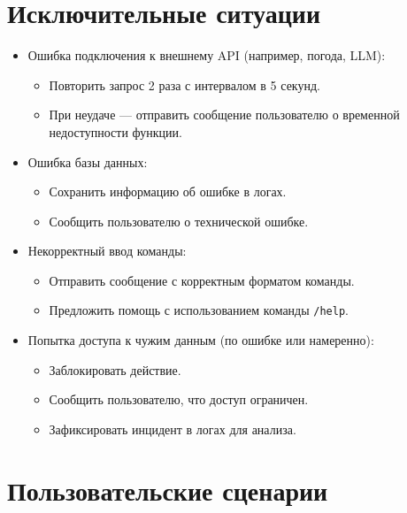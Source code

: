 \documentclass[areasetadvanced]{scrartcl}
\begin{document}
\section{Исключительные ситуации}
\begin{itemize}
  \item Ошибка подключения к внешнему API (например, погода, LLM): \begin{itemize}
    \item Повторить запрос 2 раза с интервалом в 5 секунд.
    \item При неудаче — отправить сообщение пользователю о временной недоступности функции.
  \end{itemize}
  \item Ошибка базы данных: \begin{itemize}
    \item Сохранить информацию об ошибке в логах.
    \item Сообщить пользователю о технической ошибке.
  \end{itemize}
  \item Некорректный ввод команды: \begin{itemize}
    \item Отправить сообщение с корректным форматом команды.
    \item Предложить помощь с использованием команды \texttt{/help}.
  \end{itemize}
  \item Попытка доступа к чужим данным (по ошибке или намеренно): \begin{itemize}
    \item Заблокировать действие.
    \item Сообщить пользователю, что доступ ограничен.
    \item Зафиксировать инцидент в логах для анализа.
  \end{itemize}
\end{itemize}
\newpage
\section{Пользовательские сценарии}
\end{document}

